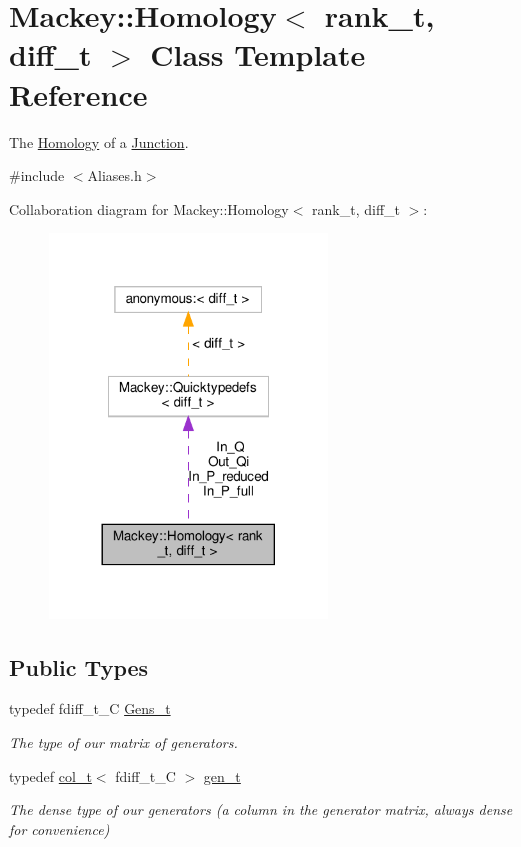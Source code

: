 \hypertarget{classMackey_1_1Homology}{}\section{Mackey\+:\+:Homology$<$ rank\+\_\+t, diff\+\_\+t $>$ Class Template Reference}
\label{classMackey_1_1Homology}


The \hyperlink{classMackey_1_1Homology}{Homology} of a \hyperlink{classMackey_1_1Junction}{Junction}.  




{\ttfamily \#include $<$Aliases.\+h$>$}



Collaboration diagram for Mackey\+:\+:Homology$<$ rank\+\_\+t, diff\+\_\+t $>$\+:\nopagebreak
\begin{figure}[H]
\begin{center}
\leavevmode
\includegraphics[width=209pt]{classMackey_1_1Homology__coll__graph}
\end{center}
\end{figure}
\subsection*{Public Types}
\begin{DoxyCompactItemize}
\item 
typedef fdiff\+\_\+t\+\_\+C \hyperlink{classMackey_1_1Homology_a986c3a6644aa52dc8279a26ade42fd64}{Gens\+\_\+t}
\begin{DoxyCompactList}\small\item\em The type of our matrix of generators. \end{DoxyCompactList}\item 
typedef \hyperlink{namespaceMackey_a3374980e3b5001f5ba9b206004180627}{col\+\_\+t}$<$ fdiff\+\_\+t\+\_\+C $>$ \hyperlink{classMackey_1_1Homology_a0f7541ee6181c75cb7efa41f3b63f0a5}{gen\+\_\+t}
\begin{DoxyCompactList}\small\item\em The dense type of our generators (a column in the generator matrix, always dense for convenience) \end{DoxyCompactList}\end{DoxyCompactItemize}
